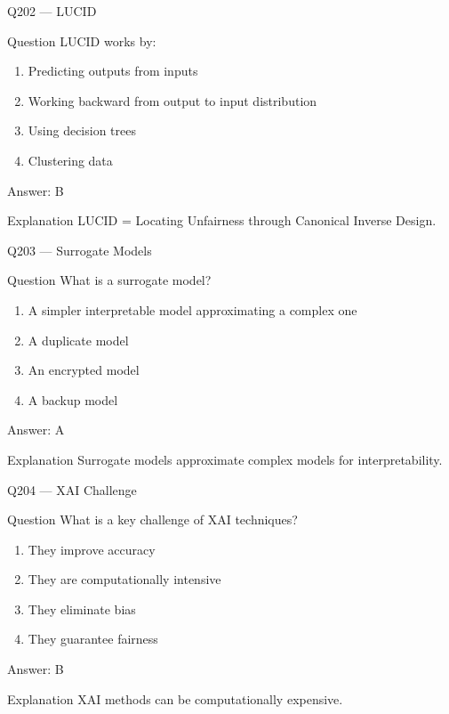 \documentclass[aspectratio=169,8pt]{beamer}
\begin{document}
\begin{frame}{Q202 --- LUCID}
\begin{block}{Question}
LUCID works by:
\begin{enumerate}
\item Predicting outputs from inputs
\item Working backward from output to input distribution
\item Using decision trees
\item Clustering data
\end{enumerate}
\end{block}
\begin{exampleblock}{Answer: B}\end{exampleblock}
\begin{block}{Explanation}
LUCID = Locating Unfairness through Canonical Inverse Design.
\end{block}
\end{frame}

\begin{frame}{Q203 --- Surrogate Models}
\begin{block}{Question}
What is a surrogate model?
\begin{enumerate}
\item A simpler interpretable model approximating a complex one
\item A duplicate model
\item An encrypted model
\item A backup model
\end{enumerate}
\end{block}
\begin{exampleblock}{Answer: A}\end{exampleblock}
\begin{block}{Explanation}
Surrogate models approximate complex models for interpretability.
\end{block}
\end{frame}

\begin{frame}{Q204 --- XAI Challenge}
\begin{block}{Question}
What is a key challenge of XAI techniques?
\begin{enumerate}
\item They improve accuracy
\item They are computationally intensive
\item They eliminate bias
\item They guarantee fairness
\end{enumerate}
\end{block}
\begin{exampleblock}{Answer: B}\end{exampleblock}
\begin{block}{Explanation}
XAI methods can be computationally expensive.
\end{block}
\end{frame}
\end{document}
